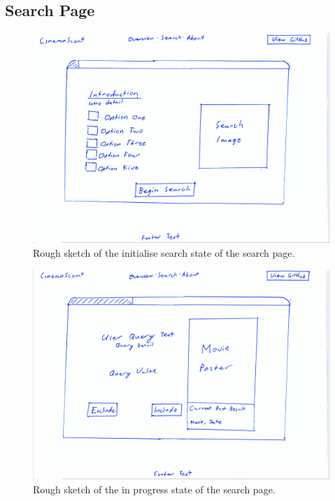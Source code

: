 \documentclass{article}
\begin{document}
\subsection{Search Page}
\begin{figure}[H]
\includegraphics[width=\columnwidth]{res/search_begin.jpg}
\caption{Rough sketch of the initialise search state of the search page.}
\end{figure}
\begin{figure}[H]
\includegraphics[width=\columnwidth]{res/search_next.jpg}
\caption{Rough sketch of the in progress state of the search page.}
\end{figure}
\end{document}
